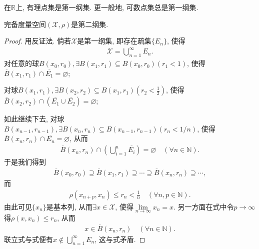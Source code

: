 \documentclass[../../main.tex]{subfiles}%
\begin{document}
\begin{examples}
在$\mathbb{R}$上, 有理点集是第一纲集. 更一般地, 可数点集总是第一纲集.
\end{examples}

\begin{theorem}[Baire纲定理]\label{theorem:泛函分析--Baire纲定理}
完备度量空间$(\mathscr{X},\rho)$是第二纲集.
\end{theorem}
\begin{proof}

用反证法. 倘若$\mathscr{X}$是第一纲集, 即存在疏集$\{E_n\}$, 使得
\begin{align}
\mathscr{X}=\bigcup\limits_{n=1}^{\infty}E_n.
\end{align}
对任意的球$B(x_0,r_0),\exists B(x_1,r_1)\subseteq B(x_0,r_0)(r_1<1)$, 使得$\overline{B}(x_1,r_1)\cap\overline{E_1}=\varnothing$;

对球$B(x_1,r_1),\exists B(x_2,r_2)\subseteq B(x_1,r_1)(r_2<\frac{1}{2})$, 使得$\overline{B}(x_2,r_2)\cap(\overline{E_1}\cup\overline{E_2})=\varnothing$;

如此继续下去, 对球$B(x_{n-1},r_{n-1}),\exists B(x_n,r_n)\subseteq B(x_{n-1},r_{n-1})(r_n<1/n)$, 使得$\overline{B}(x_n,r_n)\cap\overline{E_n}=\varnothing$, 从而
\begin{align}
\overline{B}(x_n,r_n)\cap\left(\bigcup\limits_{i=1}^{n}\overline{E_i}\right)=\varnothing\quad(\forall n\in\mathbb{N}).
\end{align}
于是我们得到
\begin{align*}
\overline{B}(x_0,r_0)\supseteq\overline{B}(x_1,r_1)\supseteq\cdots\supseteq\overline{B}(x_n,r_n)\supseteq\cdots,
\end{align*}
而
\begin{align}
\rho(x_{n+p},x_n)\leqslant r_n<\frac{1}{n}\quad(\forall n,p\in\mathbb{N}).
\end{align}
由此可见$\{x_n\}$是基本列, 从而$\exists x\in\mathscr{X}$, 使得$\lim\limits_{n\to\infty}x_n=x$. 另一方面在式中令$p\to\infty$得$\rho(x,x_n)\leqslant r_n$, 从而
\begin{align}
x\in\overline{B}(x_n,r_n)\quad(\forall n\in\mathbb{N}).
\end{align}
联立式与式便有$x\notin\bigcup\limits_{n=1}^{\infty}E_n$, 这与式矛盾.

\end{proof}
\end{document}
